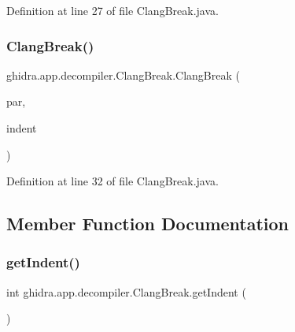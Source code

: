 Definition at line 27 of file Clang\+Break.\+java.

\mbox{\label{classghidra_1_1app_1_1decompiler_1_1_clang_break_a5fa46af3e612f50739ceb071fcd7d3b9}} 
\subsubsection{\texorpdfstring{ClangBreak()}{ClangBreak()}\hspace{0.1cm}{\footnotesize\ttfamily [2/2]}}
{\footnotesize\ttfamily ghidra.\+app.\+decompiler.\+Clang\+Break.\+Clang\+Break (\begin{DoxyParamCaption}\item[{\mbox{\hyperlink{interfaceghidra_1_1app_1_1decompiler_1_1_clang_node}{Clang\+Node}}}]{par,  }\item[{int}]{indent }\end{DoxyParamCaption})\hspace{0.3cm}{\ttfamily [inline]}}



Definition at line 32 of file Clang\+Break.\+java.



\subsection{Member Function Documentation}
\mbox{\label{classghidra_1_1app_1_1decompiler_1_1_clang_break_a03b1a3db4c98f658cc5f4d6293d3292d}} 
\subsubsection{\texorpdfstring{getIndent()}{getIndent()}}
{\footnotesize\ttfamily int ghidra.\+app.\+decompiler.\+Clang\+Break.\+get\+Indent (\begin{DoxyParamCaption}{ }\end{DoxyParamCaption})\hspace{0.3cm}{\ttfamily [inline]}}



